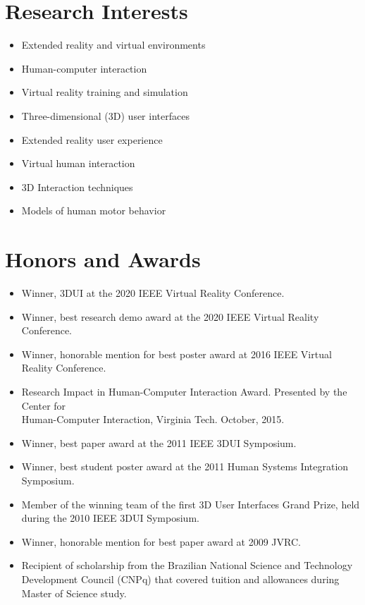 \documentclass[wideaddress]{vitae}
\begin{document}
\section{Research Interests}
\begin{itemize}
	\item{Extended reality and virtual environments}
	\item{Human-computer interaction}
	\item{Virtual reality training and simulation}
	\item{Three-dimensional (3D) user interfaces}
	\item{Extended reality user experience}
	\item{Virtual human interaction}
	\item{3D Interaction techniques}
	\item{Models of human motor behavior}
\end{itemize}

\section{Honors and Awards}
\begin{itemize}
	\item{Winner, 3DUI  at the 2020 IEEE Virtual Reality Conference.}
	\item{Winner, best research demo award at the 2020 IEEE Virtual Reality Conference.}
	\item{Winner, honorable mention for best poster award at 2016 IEEE Virtual Reality Conference.}
	\item{Research Impact in Human-Computer Interaction Award. Presented by the Center for\\Human-Computer Interaction, Virginia Tech. October, 2015.}
	\item{Winner, best paper award at the 2011 IEEE 3DUI Symposium.}
	\item{Winner, best student poster award at the 2011 Human Systems Integration Symposium.}
	\item{Member of the winning team of the first 3D User Interfaces Grand Prize, held during the 2010 IEEE 3DUI Symposium.}
	\item{Winner, honorable mention for best paper award at 2009 JVRC.}
	\item{Recipient of scholarship from the Brazilian National Science and Technology Development Council (CNPq) that covered tuition and allowances during Master of Science study.}
\end{itemize}
\end{document}
